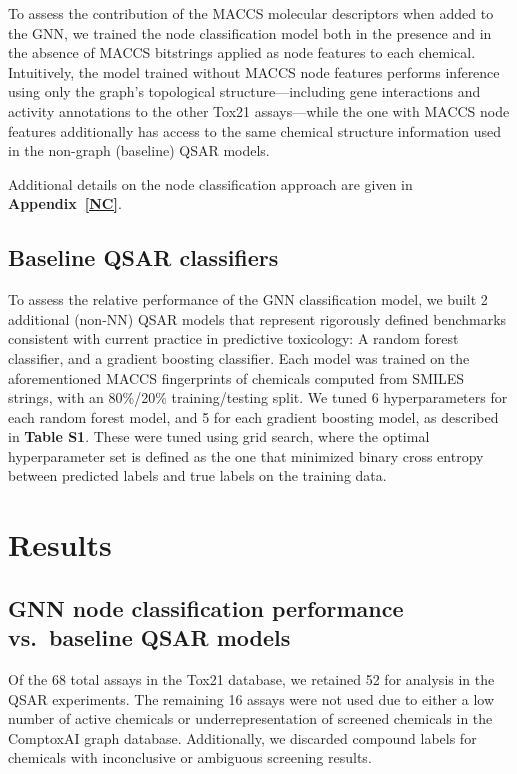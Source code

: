 \documentclass{ws-procs11x85}
\begin{document}
To assess the contribution of the MACCS molecular descriptors when added to the GNN, we trained the node classification model both in the presence and in the absence of MACCS bitstrings applied as node features to each chemical.
Intuitively, the model trained without MACCS node features performs inference using only the graph's topological structure---including gene interactions and activity annotations to the other Tox21 assays---while the one with MACCS node features additionally has access to the same chemical structure information used in the non-graph (baseline) QSAR models.

Additional details on the node classification approach are given in \textbf{Appendix~\ref{NC}}.

\subsection{Baseline QSAR classifiers}
To assess the relative performance of the GNN classification model, we built 2 additional (non-NN) QSAR models that represent rigorously defined benchmarks consistent with current practice in predictive toxicology: A random forest classifier, and a gradient boosting classifier.
Each model was trained on the aforementioned MACCS fingerprints of chemicals computed from SMILES strings, with an 80\%/20\% training/testing split.
We tuned 6 hyperparameters for each random forest model, and 5 for each gradient boosting model, as described in \textbf{Table S1}.
These were tuned using grid search, where the optimal hyperparameter set is defined as the one that minimized binary cross entropy between predicted labels and true labels on the training data.

\section{Results}
\subsection{GNN node classification performance vs.\ baseline QSAR models}
Of the 68 total assays in the Tox21 database, we retained 52 for analysis in the QSAR experiments.
The remaining 16 assays were not used due to either a low number of active chemicals or underrepresentation of screened chemicals in the ComptoxAI graph database.
Additionally, we discarded compound labels for chemicals with inconclusive or ambiguous screening results.
\end{document}
